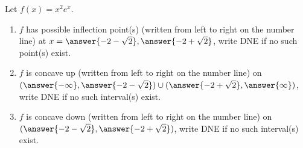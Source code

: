 \documentclass{ximera}
\author{Gregory Hartman \and Matthew Carr}
\begin{document}
\begin{exercise}






Let $f(x)=x^{2}e^x$.
\begin{enumerate}
\item		$f$ has possible inflection point(s) (written from left to right on the number line) at $x=\answer{-2-\sqrt{2}},\answer{-2+\sqrt{2}}$, write DNE if no such point(s) exist.
\item		$f$ is concave up (written from left to right on the number line) on $(\answer{-\infty},\answer{-2-\sqrt{2}})\cup(\answer{-2+\sqrt{2}},\answer{\infty})$, write DNE if no such interval(s) exist.
\item		$f$ is concave down (written from left to right on the number line) on $(\answer{-2-\sqrt{2}},\answer{-2+\sqrt{2}})$, write DNE if no such interval(s) exist.
\end{enumerate}

\end{exercise}
\end{document}
